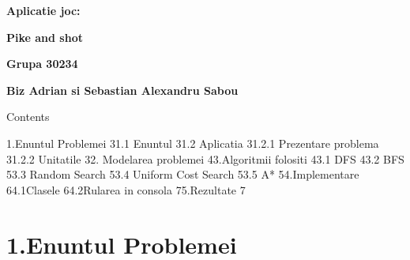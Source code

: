 \documentclass{article} %
\begin{document}


\noindent \textbf{Aplicatie joc:}

\noindent \textbf{Pike and shot}

\noindent \textbf{}

\noindent \textbf{Grupa 30234}

\noindent \textbf{Biz Adrian si Sebastian Alexandru Sabou}

\noindent 

\noindent 

\noindent 

\noindent 

\noindent 

\noindent 

\noindent 

\noindent 

\noindent 

\noindent 

\noindent 

\noindent 

\noindent 

\noindent 

\noindent 

\noindent 

\noindent 

\noindent 

\noindent 

\noindent Contents

\noindent 1.Enuntul Problemei 31.1 Enuntul 31.2 Aplicatia 31.2.1 Prezentare problema 31.2.2 Unitatile 32. Modelarea problemei 43.Algoritmii folositi 43.1 DFS 43.2 BFS 53.3 Random Search 53.4 Uniform Cost Search 53.5 A* 54.Implementare 64.1Clasele 64.2Rularea in consola 75.Rezultate 7\textbf{}

\noindent \textbf{}

\noindent \textbf{}

\noindent \textbf{}

\noindent \textbf{}

\noindent \textbf{}

\noindent \textbf{}

\noindent \textbf{}

\noindent 

\noindent 
\section{1.Enuntul Problemei}
\end{document}
